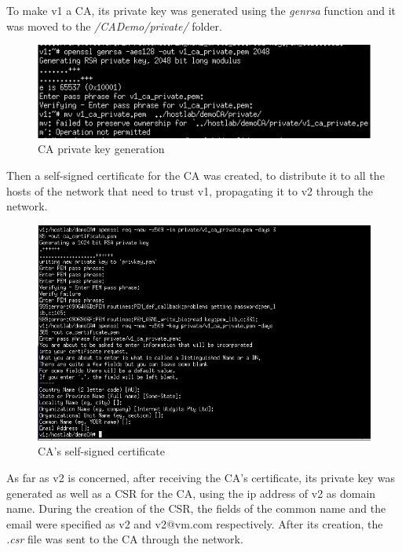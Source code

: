 \documentclass[11pt]{article}
\begin{document}
To make v1 a CA, its private key was generated using the \textit{genrsa} function and it was moved to the \textit{/CADemo/private/} folder. 
\begin{figure}[H]
	\includegraphics[width=1\textwidth]{img10-hw7-1743261.png}
	\caption{CA private key generation}
\end{figure}
Then a self-signed certiﬁcate for the CA was created, to distribute it to all the hosts of the network that need to trust v1, propagating it to v2 through the network.\\
\begin{figure}[H]
	\includegraphics[width=1\textwidth]{img11-hw7-1743261.png}
	\caption{CA's self-signed certificate}
\end{figure}
As far as v2 is concerned, after receiving the CA's certificate, its private key was generated as well as a CSR for the CA, using the ip address of v2 as domain name. During the creation of the CSR, the fields of the common name and the email were specified as v2 and v2@vm.com respectively. After its creation, the \textit{.csr} file was sent to the CA through the network.\\
\end{document}
